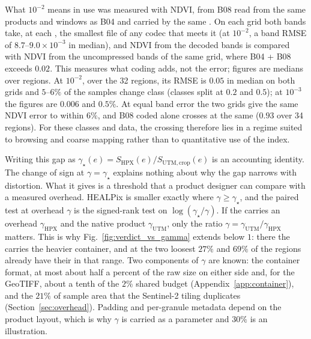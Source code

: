 What $10^{-2}$ means in use was measured with NDVI, from B08 read from
the same products and windows as B04 and carried by the same
. On each grid both bands take, at each , the
smallest file of any codec that meets it (at $10^{-2}$, a band RMSE of
$8.7$--$9.0\times10^{-3}$ in median), and NDVI from the decoded bands is
compared with NDVI from the uncompressed bands of the same grid, where
B04 + B08 exceeds $0.02$. This measures what coding adds, not the
 error; figures are medians over regions. At
$10^{-2}$, over the 32 regions, its RMSE is $0.05$ in median on both
grids and $5$--$6\%$ of the samples change class (classes split at $0.2$
and $0.5$); at $10^{-3}$ the figures are $0.006$ and $0.5\%$. At equal
band error the two grids give the same NDVI error to within $6\%$, and
B08 coded alone crosses at the same  ($0.93$ over 34
regions). For these classes and data, the crossing therefore lies in a regime
suited to browsing and coarse mapping rather than to quantitative use of
the index.

Writing this gap as
$\gamma_\star(e)=S_{\mathrm{HPX}}(e)/S_{\mathrm{UTM,crop}}(e)$ is an
accounting identity. The change of sign at $\gamma=\gamma_\star$ explains
nothing about why the gap narrows with distortion. What it gives is a
threshold that a product designer can compare with a measured overhead.
HEALPix is smaller exactly
where $\gamma\ge\gamma_\star$, and the paired test at overhead $\gamma$ is
the signed-rank test on $\log(\gamma_\star/\gamma)$. If the 
carries an overhead $\gamma_{\mathrm{HPX}}$ and the native product
$\gamma_{\mathrm{UTM}}$, only the ratio
$\gamma=\gamma_{\mathrm{UTM}}/\gamma_{\mathrm{HPX}}$ matters. This is why
Fig.~\ref{fig:verdict_vs_gamma} extends below $1$: there the 
carries the heavier container, and at the two loosest  $27\%$ and $69\%$
of the regions already have their  in that range.
Two components of $\gamma$ are known: the container format, at most
about half a percent of the raw size on either side and, for the
GeoTIFF, about a tenth of the $2\%$ shared budget
(Appendix~\ref{app:container}), and the $21\%$ of sample area that the
Sentinel-2 tiling duplicates (Section~\ref{sec:overhead}). Padding and
per-granule metadata depend on the product layout, which is why $\gamma$
is carried as a parameter and $30\%$ is an illustration.

